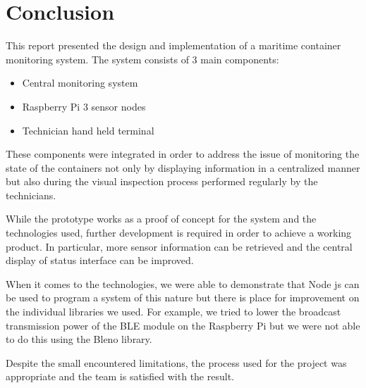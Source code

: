 \chapter{Conclusion}
\label{cha:conclusion}

This report presented the design and implementation of a maritime container monitoring system. The system consists of 3 main components:
\begin{itemize}
\item Central monitoring system
\item Raspberry Pi 3 sensor nodes
\item Technician hand held terminal
\end{itemize}

These components were integrated in order to address the issue of monitoring the state of the containers not only by displaying information in a centralized manner but also during the visual inspection process performed regularly by the technicians.

While the prototype works as a proof of concept for the system and the technologies used, further development is required in order to achieve a working product. In particular, more sensor information can be retrieved and the central display of status interface can be improved.

When it comes to the technologies, we were able to demonstrate that Node js can be used to program a system of this nature but there is place for improvement on the individual libraries we used. For example, we tried to lower the broadcast transmission power of the BLE module on the Raspberry Pi but we were not able to do this using the Bleno library.

Despite the small encountered limitations, the process used for the project was appropriate and the team is satisfied with the result.  

